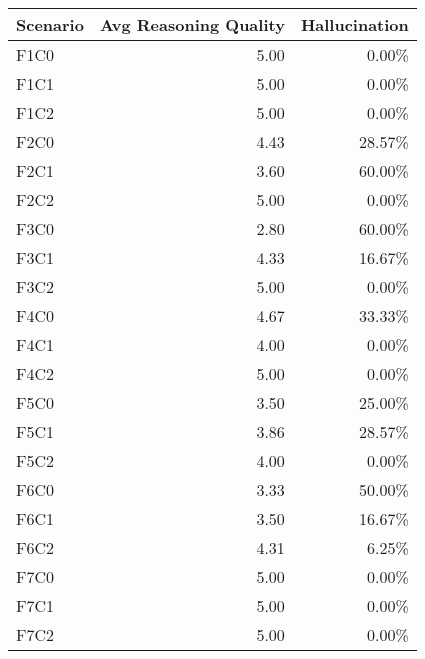 \begin{tabular}{lrr}
\toprule
Scenario & Avg Reasoning Quality & Hallucination \\
\midrule
F1C0 & 5.00 & 0.00\% \\
F1C1 & 5.00 & 0.00\% \\
F1C2 & 5.00 & 0.00\% \\
F2C0 & 4.43 & 28.57\% \\
F2C1 & 3.60 & 60.00\% \\
F2C2 & 5.00 & 0.00\% \\
F3C0 & 2.80 & 60.00\% \\
F3C1 & 4.33 & 16.67\% \\
F3C2 & 5.00 & 0.00\% \\
F4C0 & 4.67 & 33.33\% \\
F4C1 & 4.00 & 0.00\% \\
F4C2 & 5.00 & 0.00\% \\
F5C0 & 3.50 & 25.00\% \\
F5C1 & 3.86 & 28.57\% \\
F5C2 & 4.00 & 0.00\% \\
F6C0 & 3.33 & 50.00\% \\
F6C1 & 3.50 & 16.67\% \\
F6C2 & 4.31 & 6.25\% \\
F7C0 & 5.00 & 0.00\% \\
F7C1 & 5.00 & 0.00\% \\
F7C2 & 5.00 & 0.00\% \\
\bottomrule
\end{tabular}
